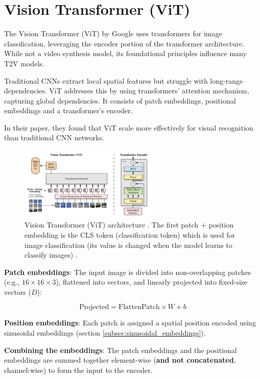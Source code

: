 \section{Vision Transformer (ViT)}
\label{appendix:vision_transformer}

The Vision Transformer (ViT) \cite{vision_transformer} by Google uses transformers for image classification, leveraging the encoder portion of the transformer architecture. While not a video synthesis model, its foundational principles influence many T2V models.

Traditional CNNs extract local spatial features but struggle with long-range dependencies. ViT addresses this by using transformers' attention mechanism, capturing global dependencies. It consists of patch embeddings, positional embeddings and a transformer's encoder.

In their paper, they found that ViT scale more effectively for visual recognition than traditional CNN networks.

\begin{figure}
    \centering
    \includegraphics[width=0.6\textwidth]{images/appendix/vision_transformer/architecture.png}
    \caption{Vision Transformer (ViT) architecture \cite{vision_transformer}. The first patch + position embedding is the CLS token (classification token) which is used for image classification (its value is changed when the model learns to classify images) \cite{vision_transformer}.}
\end{figure}

\textbf{Patch embeddings}: The input image is divided into non-overlapping patches (e.g., $16\times 16\times 3$), flattened into vectors, and linearly projected into fixed-size vectors ($D$):

\[ \text{Projected} = \text{FlattenPatch} \times W + b \]

\textbf{Position embeddings}: Each patch is assigned a spatial position encoded using sinusoidal embeddings (section \ref{subsec:sinusoidal_embeddings}).

\textbf{Combining the embeddings}: The patch embeddings and the positional embeddings are summed together element-wise (\textbf{and not concatenated}, channel-wise) to form the input to the encoder.

